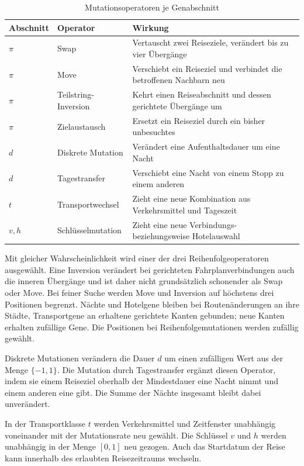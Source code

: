 \begin{table}[htbp]
  \centering
  \begin{tabular}{@{}llp{7cm}@{}}
    \toprule
    Abschnitt & Operator & Wirkung \\
    \midrule
    $\pi$ & Swap & Vertauscht zwei Reiseziele, verändert bis zu vier Übergänge \\
    $\pi$ & Move & Verschiebt ein Reiseziel und verbindet die betroffenen Nachbarn neu \\
    $\pi$ & Teilstring-Inversion & Kehrt einen Reiseabschnitt und dessen gerichtete Übergänge um \\
    $\pi$ & Zielaustausch & Ersetzt ein Reiseziel durch ein bisher unbesuchtes \\
    $d$ & Diskrete Mutation & Verändert eine Aufenthaltsdauer um eine Nacht \\
    $d$ & Tagestransfer & Verschiebt eine Nacht von einem Stopp zu einem anderen \\
    $t$ & Transportwechsel & Zieht eine neue Kombination aus Verkehrsmittel und  Tageszeit\\
        $v,h$ & Schlüsselmutation & Zieht eine neue Verbindungs- beziehungsweise Hotelauswahl \\
    \bottomrule
  \end{tabular}
  \caption{Mutationsoperatoren je Genabschnitt}
  \label{tab:mutationen}
\end{table}

Mit gleicher Wahrscheinlichkeit wird einer der drei Reihenfolgeoperatoren ausgewählt. Eine Inversion verändert bei gerichteten Fahrplanverbindungen auch die inneren Übergänge und ist daher nicht grundsätzlich schonender als Swap oder Move. Bei feiner Suche werden Move und Inversion auf höchstens drei Positionen begrenzt. Nächte und Hotelgene bleiben bei Routenänderungen an ihre Städte, Transportgene an erhaltene gerichtete Kanten gebunden; neue Kanten erhalten zufällige Gene. Die Positionen bei Reihenfolgemutationen werden zufällig gewählt.

Diskrete Mutationen verändern die Dauer $d$ um einen zufälligen Wert aus der Menge $\{-1,1\}$. Die Mutation durch Tagestransfer ergänzt diesen Operator, indem sie einem Reiseziel oberhalb der Mindestdauer eine Nacht nimmt und einem anderen eine gibt. Die Summe der Nächte insgesamt bleibt dabei unverändert.

In der Transportklasse $t$ werden Verkehrsmittel und Zeitfenster unabhängig voneinander mit der Mutationsrate neu gewählt. Die Schlüssel $v$ und $h$ werden unabhängig in der Menge $[0,1]$ neu gezogen. Auch das Startdatum der Reise kann innerhalb des erlaubten Reisezeitraums wechseln. 

